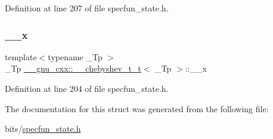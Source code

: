 Definition at line 207 of file specfun\+\_\+state.\+h.

\mbox{\label{struct____gnu__cxx_1_1____chebyshev__t__t_adc03ac0a37e1d895bd74330772146eb7}} 
\subsubsection{\texorpdfstring{\+\_\+\+\_\+x}{\_\_x}}
{\footnotesize\ttfamily template$<$typename \+\_\+\+Tp $>$ \\
\+\_\+\+Tp \hyperlink{struct____gnu__cxx_1_1____chebyshev__t__t}{\+\_\+\+\_\+gnu\+\_\+cxx\+::\+\_\+\+\_\+chebyshev\+\_\+t\+\_\+t}$<$ \+\_\+\+Tp $>$\+::\+\_\+\+\_\+x}



Definition at line 204 of file specfun\+\_\+state.\+h.



The documentation for this struct was generated from the following file\+:\begin{DoxyCompactItemize}
\item 
bits/\hyperlink{specfun__state_8h}{specfun\+\_\+state.\+h}\end{DoxyCompactItemize}
